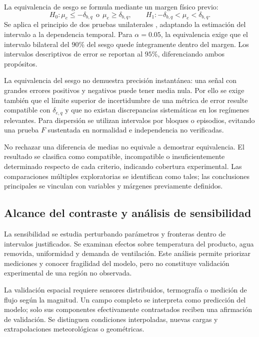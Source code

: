 La equivalencia de sesgo se formula mediante un margen físico previo:
\begin{equation}
H_0:\mu_e\leq-\delta_{b,q}\ \ \text{o}\ \
\mu_e\geq\delta_{b,q},
\qquad
H_1:-\delta_{b,q}<\mu_e<\delta_{b,q}.
\label{met:equivalencia}
\end{equation}
Se aplica el principio de dos pruebas unilaterales \cite{schuirmann1987}, adaptando la estimación del intervalo a la dependencia temporal. Para $\alpha=0.05$, la equivalencia exige que el intervalo bilateral del $90\%$ del sesgo quede íntegramente dentro del margen. Los intervalos descriptivos de error se reportan al $95\%$, diferenciando ambos propósitos.

La equivalencia del sesgo no demuestra precisión instantánea: una señal con grandes errores positivos y negativos puede tener media nula. Por ello se exige también que el límite superior de incertidumbre de una métrica de error resulte compatible con $\delta_{e,q}$ y que no existan discrepancias sistemáticas en los regímenes relevantes. Para dispersión se utilizan intervalos por bloques o episodios, evitando una prueba $F$ sustentada en normalidad e independencia no verificadas.

No rechazar una diferencia de medias no equivale a demostrar equivalencia. El resultado se clasifica como compatible, incompatible o insuficientemente determinado respecto de cada criterio, indicando cobertura experimental. Las comparaciones múltiples exploratorias se identifican como tales; las conclusiones principales se vinculan con variables y márgenes previamente definidos.

\subsection{Alcance del contraste y análisis de sensibilidad}

La sensibilidad se estudia perturbando parámetros y fronteras dentro de intervalos justificados. Se examinan efectos sobre temperatura del producto, agua removida, uniformidad y demanda de ventilación. Este análisis permite priorizar mediciones y conocer fragilidad del modelo, pero no constituye validación experimental de una región no observada.

La validación espacial requiere sensores distribuidos, termografía o medición de flujo según la magnitud. Un campo completo se interpreta como predicción del modelo; solo sus componentes efectivamente contrastados reciben una afirmación de validación. Se distinguen condiciones interpoladas, nuevas cargas y extrapolaciones meteorológicas o geométricas.


